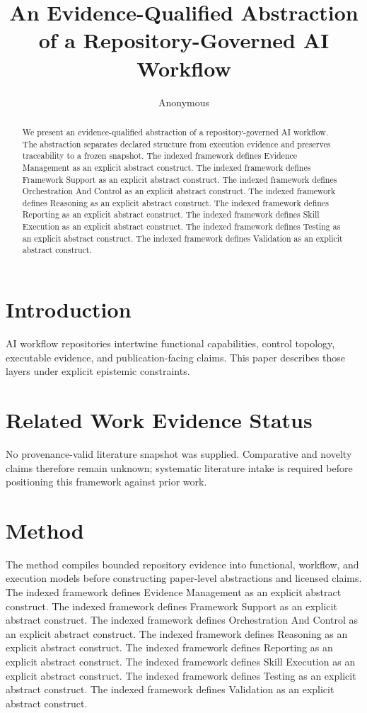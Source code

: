 \documentclass[11pt]{article}
\title{An Evidence-Qualified Abstraction of a Repository-Governed AI Workflow}
\author{Anonymous}
\date{}
\begin{document}
\maketitle
\begin{abstract}
We present an evidence-qualified abstraction of a repository-governed AI workflow. The abstraction separates declared structure from execution evidence and preserves traceability to a frozen snapshot. The indexed framework defines Evidence Management as an explicit abstract construct. The indexed framework defines Framework Support as an explicit abstract construct. The indexed framework defines Orchestration And Control as an explicit abstract construct. The indexed framework defines Reasoning as an explicit abstract construct. The indexed framework defines Reporting as an explicit abstract construct. The indexed framework defines Skill Execution as an explicit abstract construct. The indexed framework defines Testing as an explicit abstract construct. The indexed framework defines Validation as an explicit abstract construct.
\end{abstract}

\section{Introduction}

AI workflow repositories intertwine functional capabilities, control topology, executable evidence, and publication-facing claims. This paper describes those layers under explicit epistemic constraints.

\section{Related Work Evidence Status}

No provenance-valid literature snapshot was supplied. Comparative and novelty claims therefore remain unknown; systematic literature intake is required before positioning this framework against prior work.

\section{Method}

The method compiles bounded repository evidence into functional, workflow, and execution models before constructing paper-level abstractions and licensed claims. The indexed framework defines Evidence Management as an explicit abstract construct. The indexed framework defines Framework Support as an explicit abstract construct. The indexed framework defines Orchestration And Control as an explicit abstract construct. The indexed framework defines Reasoning as an explicit abstract construct. The indexed framework defines Reporting as an explicit abstract construct. The indexed framework defines Skill Execution as an explicit abstract construct. The indexed framework defines Testing as an explicit abstract construct. The indexed framework defines Validation as an explicit abstract construct.
\end{document}
